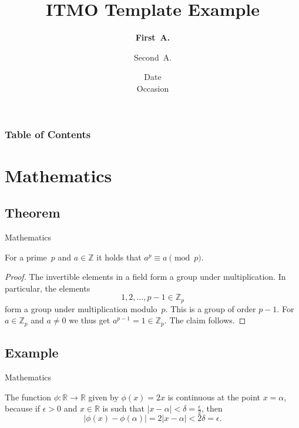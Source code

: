 \documentclass[11pt, aspectratio=169]{beamer}
\title{ITMO Template Example}
\author[Author, Another]{
  {\bf First~A.}\inst{1} \and 
  Second~A.\inst{2}
}
\institute[ITMO University] %
{
\hfill
\begin{minipage}[t]{0.4\textwidth}
    \centering{\inst{1}%
  Faculty/Department, 
  ITMO University}
\end{minipage}
\hfill
\begin{minipage}[t]{0.4\textwidth}
    \centering{\inst{2}%
  Faculty/Department, 
  ITMO University}
\end{minipage}
\hfill
 }
\date[Occasion]{Date \\ Occasion}
\begin{document}
\frame{\titlepage}

\begin{frame}\frametitle{Table of Contents}
  \tableofcontents
\end{frame}

\section{Mathematics}
\subsection{Theorem}


\begin{frame}{Mathematics}
    \begin{theorem}
        For a prime~\(p\) and \(a \in \mathbb{Z}\) it holds that \(a^p \equiv a \pmod{p}\).
    \end{theorem}

    \begin{proof}
        The invertible elements in a field form a group under multiplication.
        In particular, the elements
        \begin{equation*}
            1, 2, \ldots, p - 1 \in \mathbb{Z}_p
        \end{equation*}
        form a group under multiplication modulo~\(p\).
        This is a group of order \(p - 1\).
        For \(a \in \mathbb{Z}_p\) and \(a \neq 0\) we thus get \(a^{p-1} = 1 \in \mathbb{Z}_p\).
        The claim follows.
    \end{proof}
\end{frame}


\subsection{Example}


\begin{frame}{Mathematics}
    \begin{example}
        The function \(\phi \colon \mathbb{R} \to \mathbb{R}\) given by \(\phi(x) = 2x\) is continuous at the point \(x = \alpha\),
        because if \(\epsilon > 0\) and \(x \in \mathbb{R}\) is such that \(\lvert x - \alpha \rvert < \delta = \frac{\epsilon}{2}\),
        then
        \begin{equation*}
            \lvert \phi(x) - \phi(\alpha)\rvert = 2\lvert x - \alpha \rvert < 2\delta = \epsilon.
        \end{equation*}
    \end{example}
\end{frame}
\end{document}
